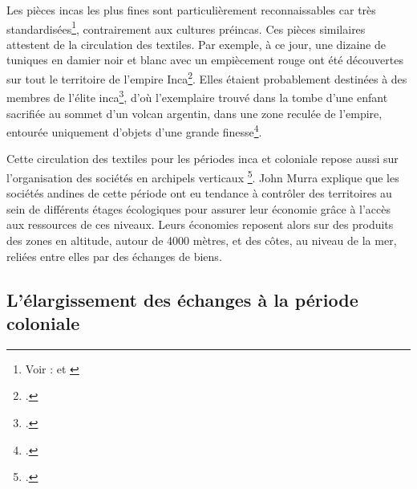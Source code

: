 Les pièces incas les plus fines sont particulièrement reconnaissables car très standardisées\footnote{Voir : \cite[p.~60]{nilesArtistEmpireInca1994} et \cite[p.~118]{ramosTejidosSociedadColonial2010}}, contrairement aux cultures préincas. Ces pièces similaires attestent de la circulation des textiles. Par exemple, à ce jour, une dizaine de tuniques en damier noir et blanc avec un empiècement rouge ont été découvertes sur tout le territoire de l'empire Inca\footcite[p.395]{abalderussoArteTextilIncaico2010}. Elles étaient probablement destinées à des membres de l'élite inca\footcite[p.54]{nilesArtistEmpireInca1994}, d'où l'exemplaire trouvé dans la tombe d'une enfant sacrifiée au sommet d'un volcan argentin, dans une zone reculée de l'empire, entourée uniquement d'objets d'une grande finesse\footcite[p.260]{abalderussoArteTextilIncaico2010}.

Cette circulation des textiles pour les périodes inca et coloniale repose aussi sur l'organisation des sociétés en \og archipels verticaux \fg\footcite[p.~60]{murraControlVerticalMaximo1975}. John Murra explique que les sociétés andines de cette période ont eu tendance à contrôler des territoires au sein de différents étages écologiques pour assurer leur économie grâce à l'accès aux ressources de ces niveaux. Leurs économies reposent alors sur des produits des zones en altitude, autour de 4000 mètres, et des côtes, au niveau de la mer, reliées entre elles par des échanges de biens.

\subsection{L'élargissement des échanges à la période coloniale}

